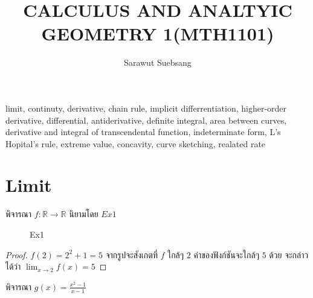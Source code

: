 \documentclass[a4paper,12pt]{scrartcl}
\title{\textbf{CALCULUS AND ANALTYIC  GEOMETRY 1(MTH1101)}}
\author{Sarawut Suebsang}
\begin{document}
	\maketitle
\section{\protect {}}
limit, continuty, derivative, chain rule, implicit differrentiation, higher-order derivative, differential, antiderivative, definite integral, area between curves, derivative and integral of transcendental function, indeterminate form, L's Hopital's rule, extreme value, concavity, curve sketching, realated rate

\section{Limit} 
\begin{example}
	พิจารณา $f: \mathbb{R} \rightarrow \mathbb{R}$  นิยามโดย $Ex1$
\end{example}
\begin{figure}[h!]
	\centering
	\caption{Ex1}
	\label{fig:f1}
\end{figure}
\begin{proof}
	$f(2) = 2^2+1 = 5 $ จากรูปจะสังเกตที่ $f$ ใกล้ๆ $2$ ค่าของฟังก์ชันจะใกล้ๆ $5$ ด้วย จะกล่าวได้ว่า
	$\lim_{x \to 2} f(x) = 5$
\end{proof}



\begin{example}
	พิจารณา $g(x) = \frac{x^2-1}{x-1}$
\end{example}
\end{document}

